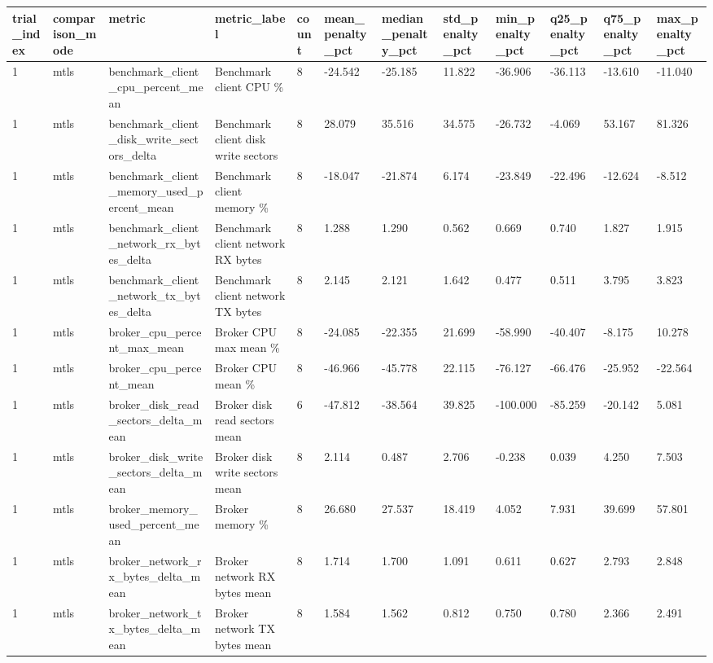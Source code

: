 \begin{longtable}{llllllllllll}
\hline
trial\_index & comparison\_mode & metric & metric\_label & count & mean\_penalty\_pct & median\_penalty\_pct & std\_penalty\_pct & min\_penalty\_pct & q25\_penalty\_pct & q75\_penalty\_pct & max\_penalty\_pct \\
\hline
1 & mtls & benchmark\_client\_cpu\_percent\_mean & Benchmark client CPU \% & 8 & -24.542 & -25.185 & 11.822 & -36.906 & -36.113 & -13.610 & -11.040 \\
1 & mtls & benchmark\_client\_disk\_write\_sectors\_delta & Benchmark client disk write sectors & 8 & 28.079 & 35.516 & 34.575 & -26.732 & -4.069 & 53.167 & 81.326 \\
1 & mtls & benchmark\_client\_memory\_used\_percent\_mean & Benchmark client memory \% & 8 & -18.047 & -21.874 & 6.174 & -23.849 & -22.496 & -12.624 & -8.512 \\
1 & mtls & benchmark\_client\_network\_rx\_bytes\_delta & Benchmark client network RX bytes & 8 & 1.288 & 1.290 & 0.562 & 0.669 & 0.740 & 1.827 & 1.915 \\
1 & mtls & benchmark\_client\_network\_tx\_bytes\_delta & Benchmark client network TX bytes & 8 & 2.145 & 2.121 & 1.642 & 0.477 & 0.511 & 3.795 & 3.823 \\
1 & mtls & broker\_cpu\_percent\_max\_mean & Broker CPU max mean \% & 8 & -24.085 & -22.355 & 21.699 & -58.990 & -40.407 & -8.175 & 10.278 \\
1 & mtls & broker\_cpu\_percent\_mean & Broker CPU mean \% & 8 & -46.966 & -45.778 & 22.115 & -76.127 & -66.476 & -25.952 & -22.564 \\
1 & mtls & broker\_disk\_read\_sectors\_delta\_mean & Broker disk read sectors mean & 6 & -47.812 & -38.564 & 39.825 & -100.000 & -85.259 & -20.142 & 5.081 \\
1 & mtls & broker\_disk\_write\_sectors\_delta\_mean & Broker disk write sectors mean & 8 & 2.114 & 0.487 & 2.706 & -0.238 & 0.039 & 4.250 & 7.503 \\
1 & mtls & broker\_memory\_used\_percent\_mean & Broker memory \% & 8 & 26.680 & 27.537 & 18.419 & 4.052 & 7.931 & 39.699 & 57.801 \\
1 & mtls & broker\_network\_rx\_bytes\_delta\_mean & Broker network RX bytes mean & 8 & 1.714 & 1.700 & 1.091 & 0.611 & 0.627 & 2.793 & 2.848 \\
1 & mtls & broker\_network\_tx\_bytes\_delta\_mean & Broker network TX bytes mean & 8 & 1.584 & 1.562 & 0.812 & 0.750 & 0.780 & 2.366 & 2.491 \\

\end{longtable}
